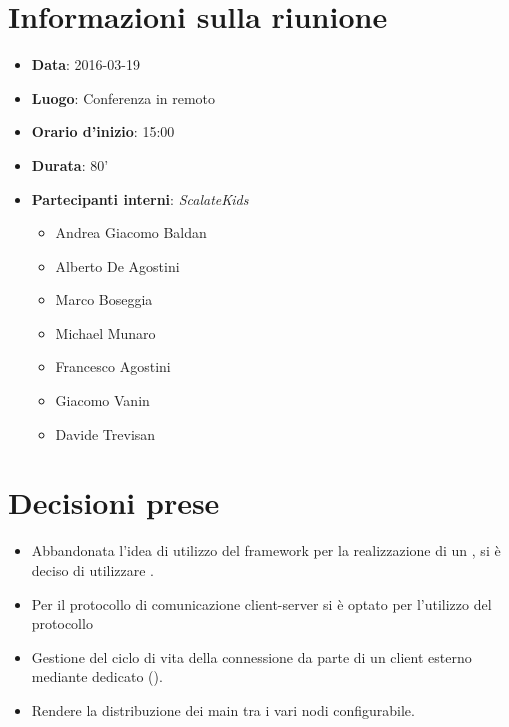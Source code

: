 \documentclass{scalatekids-article}
\begin{document}
\section{Informazioni sulla riunione}
\begin{itemize}
\item \textbf{Data}: 2016-03-19
\item \textbf{Luogo}: Conferenza in remoto
\item \textbf{Orario d'inizio}: 15:00
\item \textbf{Durata}: 80'
\item \textbf{Partecipanti interni}: \textit{ScalateKids}
  \begin{itemize}
  \item Andrea Giacomo Baldan 
  \item Alberto De Agostini
  \item Marco Boseggia
  \item Michael Munaro
  \item Francesco Agostini
  \item Giacomo Vanin
  \item Davide Trevisan
  \end{itemize}
\end{itemize}
\section{Decisioni prese}
\begin{itemize}
  \item Abbandonata l'idea di utilizzo del framework  per la realizzazione di un , si è deciso di utilizzare .
  \item Per il protocollo di comunicazione client-server si è optato per l'utilizzo del protocollo 
  \item Gestione del ciclo di vita della connessione da parte di un client esterno mediante  dedicato (\textit{}).
  \item Rendere la distribuzione dei main tra i vari nodi configurabile.
\end{itemize}
\end{document}
